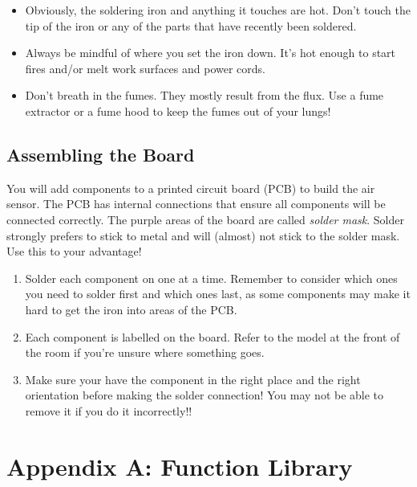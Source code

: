 \documentclass[]{book}
\providecommand{\tightlist}{%
  \setlength{\itemsep}{0pt}\setlength{\parskip}{0pt}}
\begin{document}
\begin{itemize}
\tightlist
\item
  Obviously, the soldering iron and anything it touches are hot. Don't touch the tip of the iron or any of the parts that have recently been soldered.
\item
  Always be mindful of where you set the iron down. It's hot enough to start fires and/or melt work surfaces and power cords.
\item
  Don't breath in the fumes. They mostly result from the flux. Use a fume extractor or a fume hood to keep the fumes out of your lungs!
\end{itemize}

\hypertarget{assembling-the-board}{%
\section{Assembling the Board}\label{assembling-the-board}}

You will add components to a printed circuit board (PCB) to build the air sensor. The PCB has internal connections that ensure all components will be connected correctly. The purple areas of the board are called \emph{solder mask}. Solder strongly prefers to stick to metal and will (almost) not stick to the solder mask. Use this to your advantage!

\begin{enumerate}
\def\labelenumi{\arabic{enumi}.}
\tightlist
\item
  Solder each component on one at a time. Remember to consider which ones you need to solder first and which ones last, as some components may make it hard to get the iron into areas of the PCB.
\item
  Each component is labelled on the board. Refer to the model at the front of the room if you're unsure where something goes.
\item
  Make sure your have the component in the right place and the right orientation before making the solder connection! You may not be able to remove it if you do it incorrectly!!
\end{enumerate}

\hypertarget{appendix-a-function-library}{%
\chapter*{Appendix A: Function Library}\label{appendix-a-function-library}}
\end{document}
